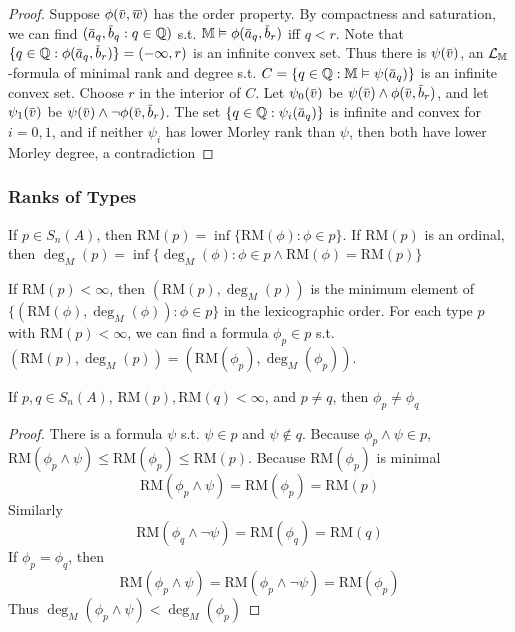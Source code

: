 \documentclass[11pt]{article}
\def \RM {\text{RM}}
\begin{document}
\begin{proof}
Suppose \(\phi(\barv,\barw)\) has the order property. By compactness and saturation, we can
find \((\bara_q,\barb_q:q\in\Q)\) s.t. \(\M\vDash\phi(\bara_q,\barb_r)\) iff \(q<r\).
Note that \(\{q\in\Q:\phi(\bara_q,\barb_r)\}=(-\infty,r)\) is an infinite convex set. Thus there
is \(\psi(\barv)\), an \(\mathcal{L}_{\mathbb{M}}\)-formula of minimal rank and degree s.t. \(C=\{q\in\Q:\M\vDash\psi(\bara_q)\}\)
is an infinite convex set.
Choose \(r\) in the interior of \(C\). Let \(\psi_0(\barv)\) be \(\psi(\barv)\wedge\phi(\barv,\barb_r)\), and
let \(\psi_1(\barv)\) be \(\psi(\barv)\wedge\neg\phi(\barv,\barb_r)\). The set \(\{q\in\Q:\psi_i(\bara_q)\}\) is infinite
and convex for \(i=0,1\), and if neither \(\psi_i\) has lower Morley rank than \(\psi\), then both have
lower Morley degree, a contradiction
\end{proof}
\subsubsection{Ranks of Types}
\label{sec:orgcecfa98}
\begin{definition}[]
If \(p\in S_n(A)\), then \(\RM(p)=\inf\{\RM(\phi):\phi\in p\}\). If \(\RM(p)\) is an ordinal,
then \(\deg_M(p)=\inf\{\deg_M(\phi):\phi\in p\wedge\RM(\phi)=\RM(p)\}\)
\end{definition}

If \(\RM(p)<\infty\), then \((\RM(p),\deg_M(p))\) is the minimum element
of \(\{(\RM(\phi),\deg_M(\phi)):\phi\in p\}\) in the lexicographic order. For each type \(p\)
with \(\RM(p)<\infty\), we can find a formula \(\phi_p\in p\)
s.t. \((\RM(p),\deg_M(p))=(\RM(\phi_p),\deg_M(\phi_p))\).

\begin{lemma}[]
If \(p,q\in S_n(A)\), \(\RM(p),\RM(q)<\infty\), and \(p\neq q\), then \(\phi_p\neq\phi_q\)
\end{lemma}

\begin{proof}
There is a formula \(\psi\) s.t. \(\psi\in p\) and \(\psi\notin q\).
Because \(\phi_p\wedge\psi\in p\), \(\RM(\phi_p\wedge\psi)\le\RM(\phi_p)\le\RM(p)\). Because \(\RM(\phi_p)\) is minimal
\begin{equation*}
\RM(\phi_p\wedge\psi)=\RM(\phi_p)=\RM(p)
\end{equation*}
Similarly
\begin{equation*}
\RM(\phi_q\wedge\neg\psi)=\RM(\phi_q)=\RM(q)
\end{equation*}
If \(\phi_p=\phi_q\), then
\begin{equation*}
\RM(\phi_p\wedge\psi)=\RM(\phi_p\wedge\neg\psi)=\RM(\phi_p)
\end{equation*}
Thus \(\deg_M(\phi_p\wedge\psi)<\deg_M(\phi_p)\)
\end{proof}
\end{document}
